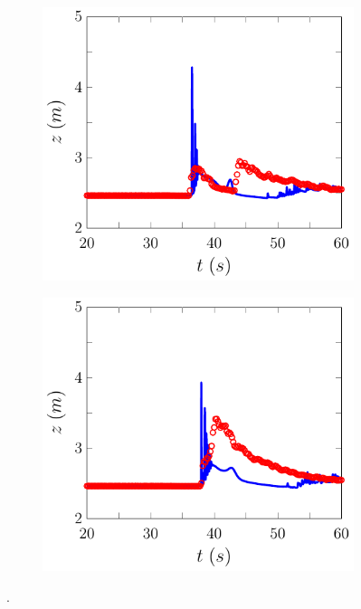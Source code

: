 \begin{figure}
	\centering
	\begin{subfigure}{0.5\textwidth}
		\includegraphics[width=\textwidth]{./chp6/figures/Experiment/Roeber/Trial8/FEVM/WG13-figure0.pdf}
		\vspace{0.5cm}
	\end{subfigure}%
	\begin{subfigure}{0.5\textwidth}
		\includegraphics[width=\textwidth]{./chp6/figures/Experiment/Roeber/Trial8/FEVM/WG14-figure0.pdf}
		\vspace{0.5cm}
	\end{subfigure}
	\caption{.}
	\label{fig:Roeber13WG7to14FEVM}
\end{figure}

